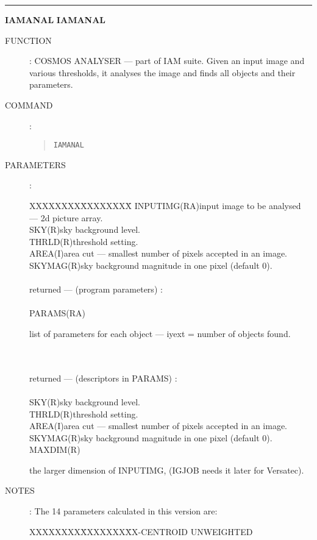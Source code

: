 \goodbreak
\rule{\textwidth}{0.3mm}
{\Large {\bf IAMANAL} \hfill {\bf IAMANAL}}
\begin{description}
\item [FUNCTION]:
COSMOS ANALYSER --- part of IAM suite.
Given an input image and various thresholds, it analyses the image and finds all
objects and their parameters.
\item [COMMAND]:
\begin{quote}
{\tt IAMANAL}
\end{quote}
\item [PARAMETERS] :
\begin{tabbing}
XXXXXXXX\=XXXXXXXX\=\kill
INPUTIMG\>(RA)\>input image to be analysed --- 2d picture array.\\
SKY\>(R)\>sky background level.\\
THRLD\>(R)\>threshold setting.\\
AREA\>(I)\>area cut --- smallest number of pixels accepted in an image.\\
SKYMAG\>(R)\>sky background magnitude in one pixel (default 0).\\
\\
returned --- (program parameters) :\\
\\
PARAMS\>(RA)\>\begin{minipage}[t]{100mm}
list of parameters for each object --- iyext = number of objects found.
\end{minipage}\\
\\
returned --- (descriptors in PARAMS) :\\
\\
SKY\>(R)\>sky background level.\\
THRLD\>(R)\>threshold setting.\\
AREA\>(I)\>area cut --- smallest number of pixels accepted in an image.\\
SKYMAG\>(R)\>sky background magnitude in one pixel (default 0).\\
MAXDIM\>(R)\>\begin{minipage}[t]{100mm}
the larger dimension of INPUTIMG, (IGJOB needs it later for Versatec).
\end{minipage}
\end{tabbing}
\item [NOTES]:
The 14 parameters calculated in this version are:
\begin{tabbing}
XXXXXXXX\=XXXXXXXX\=\>X-CENTROID UNWEIGHTED\\

\end{tabbing}
\end{description}

